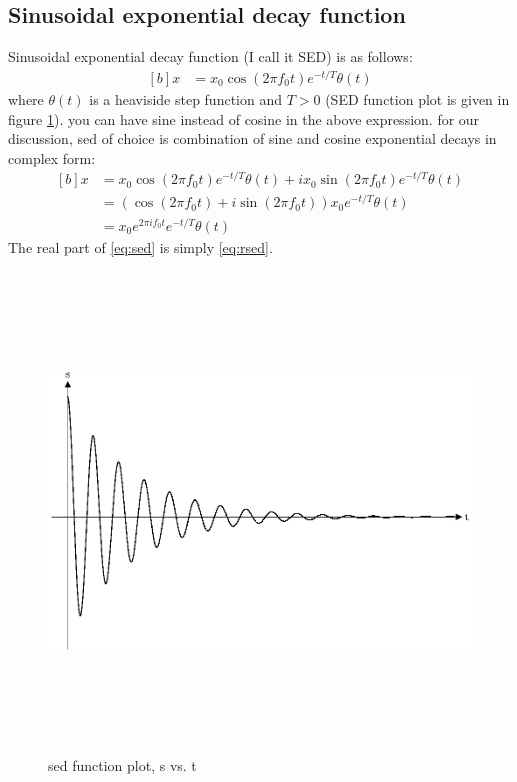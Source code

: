 \documentclass[letterpaper, 11pt]{article}
\newcommand{\sed}[2]{#2_{0}e^{2\pi if_{0}#1}e^{-#1/T} \theta (#1)} %
\numberwithin{equation}{section}
\numberwithin{figure}{section}
\numberwithin{table}{section}
\begin{document}
\subsection{Sinusoidal exponential decay function}
Sinusoidal exponential decay function (I call it SED) is as follows:
\begin{equation}
	\begin{aligned}[b]
		x &= x_{0}\cos{(2\pi f_{0}t)}e^{-t/T} \theta(t)
		\label{eq:rsed}
	\end{aligned}
\end{equation}
where \(\theta (t)\) is a heaviside step function and \(T > 0\) (SED function plot is given in figure \ref{fig1}). you can have sine instead of cosine in the above expression. for our discussion, sed of choice is combination of sine and cosine exponential decays in complex form:
\begin{equation}
	\begin{aligned}[b]
		x	&= x_{0}\cos{(2\pi f_{0}t)}e^{-t/T} \theta(t)+ i x_{0}\sin{(2\pi f_{0}t)}e^{-t/T} \theta(t)\\
			&= (\cos{(2\pi f_{0}t)} +i \sin{(2\pi f_{0}t)})x_{0}e^{-t/T} \theta(t) \\
			&= \sed{t}{x}
			\label{eq:sed}
	\end{aligned}
\end{equation}
The real part of \eqref{eq:sed} is simply \eqref{eq:rsed}.


\begin{figure}[H]
	\centering
	\includegraphics[height=5in]{sed.eps}
	\caption{sed function plot, s vs. t}
	\label{fig1}
\end{figure}
\end{document}

